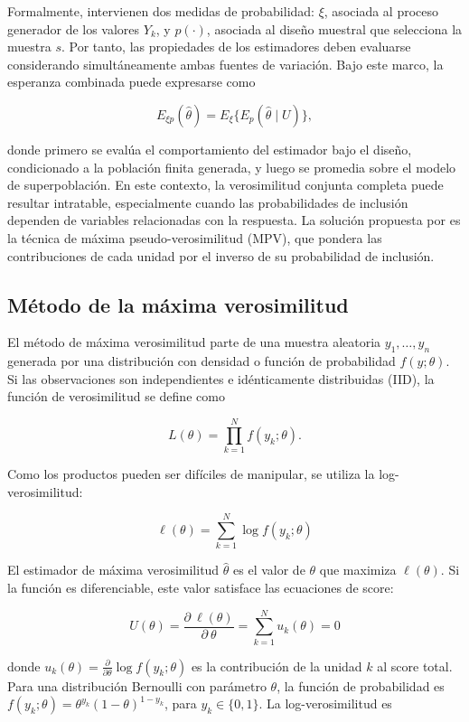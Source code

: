 \documentclass[
  spanish,
  12pt,
]{book}
\begin{document}
Formalmente, intervienen dos medidas de probabilidad: \(\xi\), asociada al proceso generador de los valores \(Y_k\), y \(p(\cdot)\), asociada al diseño muestral que selecciona la muestra \(s\). Por tanto, las propiedades de los estimadores deben evaluarse considerando simultáneamente ambas fuentes de variación. Bajo este marco, la esperanza combinada puede expresarse como

\[
E_{\xi p}(\hat{\theta})
= E_{\xi}\{E_p(\hat{\theta}\mid U)\},
\]

donde primero se evalúa el comportamiento del estimador bajo el diseño, condicionado a la población finita generada, y luego se promedia sobre el modelo de superpoblación. En este contexto, la verosimilitud conjunta completa puede resultar intratable, especialmente cuando las probabilidades de inclusión dependen de variables relacionadas con la respuesta. La solución propuesta por \citet{pfeffermann1993role} es la técnica de máxima pseudo-verosimilitud (MPV), que pondera las contribuciones de cada unidad por el inverso de su probabilidad de inclusión.

\subsection{Método de la máxima verosimilitud}\label{sec-mv}

El método de máxima verosimilitud parte de una muestra aleatoria \(y_1,\ldots,y_n\) generada por una distribución con densidad o función de probabilidad \(f(y;\theta)\). Si las observaciones son independientes e idénticamente distribuidas (IID), la función de verosimilitud se define como

\[
L(\theta)
= \prod_{k=1}^{N} f(y_k;\theta).
\]

Como los productos pueden ser difíciles de manipular, se utiliza la log-verosimilitud:

\[
\ell(\theta)
= \sum_{k=1}^{N}\log f(y_k;\theta)
\]

El estimador de máxima verosimilitud \(\hat{\theta}\) es el valor de \(\theta\) que maximiza \(\ell(\theta)\). Si la función es diferenciable, este valor satisface las ecuaciones de score:

\[
U(\theta)
= \frac{\partial \ \ell(\theta)}{\partial \ \theta}
= \sum_{k=1}^{N} u_k(\theta)
= 0
\]

donde \(u_k(\theta) = \frac{\partial}{\partial\theta}\log f(y_k;\theta)\) es la contribución de la unidad \(k\) al score total. Para una distribución Bernoulli con parámetro \(\theta\), la función de probabilidad es \(f(y_k;\theta) = \theta^{y_k}(1-\theta)^{1-y_k}\), para \(y_k \in \{0,1\}\). La log-verosimilitud es
\end{document}
